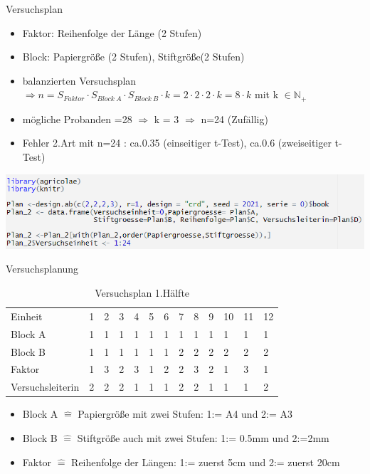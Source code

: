 \documentclass[ ngerman, fontsize= 10pt, headings=big, titlepage=true]{beamer}
\begin{document}
\begin{frame}{Versuchsplan}
	
	
	\begin{itemize}
		\item Faktor: Reihenfolge der Länge (2 Stufen)
		\item Block: Papiergröße (2 Stufen), Stiftgröße(2 Stufen)	
		\item balanzierten Versuchsplan\\
		 $\Rightarrow n = S_{Faktor} \cdot S_{Block\ A} \cdot  S_{Block\ B} \cdot k =2 \cdot 2\cdot 2\cdot k = 8\cdot k$ mit k $\in \mathbb{N}_+$
		
		\item mögliche Probanden =28 $\Rightarrow$ k = 3 $\Rightarrow$ n=24 (Zufällig)
		\item Fehler 2.Art mit n=24 : ca.0.35 (einseitiger t-Test), ca.0.6 (zweiseitiger t-Test)
		
		
	\end{itemize}
	\includegraphics[scale=0.7]{Code_Versuchsplan.png}
\end{frame}
\begin{frame}{Versuchsplanung}
{\small
\begin{table}[hb]
	\caption{Versuchsplan 1.Hälfte}
	\centering
	\begin{tabular}[b]{l||l|l|l|l|l|l|l|l|l|l|l|l}
		\hline
		Einheit & 1 & 2 & 3 & 4 & 5 & 6 & 7 & 8 & 9 & 10 & 11 & 12\\
		\hhline{=============}
		Block A & 1 & 1 & 1 & 1 & 1 & 1 & 1 & 1 & 1 & 1 & 1 & 1\\
		\hline
		Block B & 1 & 1 & 1 & 1 & 1 & 1 & 2 & 2 & 2 & 2 & 2 & 2\\
		\hline
		Faktor & 1 & 3 & 2 & 3 & 1 & 2 & 2 & 3 & 2 & 1 & 3 & 1\\
		\hhline{=============}
		Versuchsleiterin & 2 & 2 & 2 & 1 & 1 & 1 & 2 & 2 & 1 & 1 & 1 & 2\\
		\hline
	\end{tabular}
\end{table}}

\begin{itemize}
	\item Block A $\hat{=}$ Papiergröße mit zwei Stufen: 1:= A4 und 2:= A3  
	\item Block B $\hat{=}$ Stiftgröße auch mit zwei Stufen:  1:= 0.5mm und 2:=2mm 
	\item Faktor $\hat{=}$ Reihenfolge der Längen: 1:= zuerst 5cm und 2:= zuerst 20cm
\end{itemize}

\end{frame}
\end{document}
